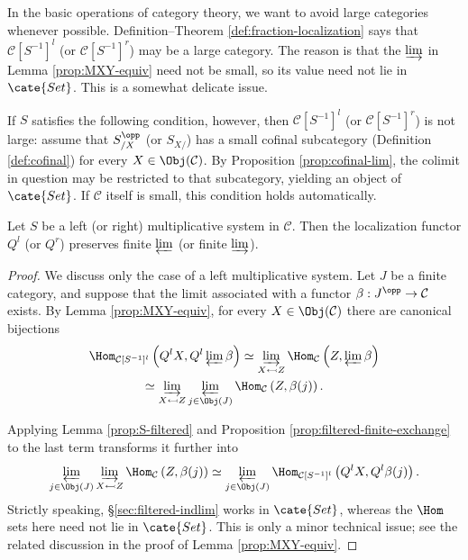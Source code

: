 \begin{remark}\label{rem:localization-size}
	In the basic operations of category theory, we want to avoid large
	categories whenever possible. Definition--Theorem
	\ref{def:fraction-localization} says that $\mathcal{C}[S^{-1}]^l$ (or
	$\mathcal{C}[S^{-1}]^r$) may be a large category. The reason is that the
	$\varinjlim$ in Lemma \ref{prop:MXY-equiv} need not be small, so its value
	need not lie in $\cate{Set}$. This is a somewhat delicate issue.

	If $S$ satisfies the following condition, however, then
	$\mathcal{C}[S^{-1}]^l$ (or $\mathcal{C}[S^{-1}]^r$) is not large: assume
	that $S_{/X}^{\opp}$ (or $S_{X/}$) has a small cofinal subcategory
	(Definition \ref{def:cofinal}) for every $X\in\Obj(\mathcal{C})$. By
	Proposition \ref{prop:cofinal-lim}, the colimit in question may be
	restricted to that subcategory, yielding an object of $\cate{Set}$. If
	$\mathcal{C}$ itself is small, this condition holds automatically.
\end{remark}

\begin{lemma}\label{prop:localization-prod}
	Let $S$ be a left (or right) multiplicative system in $\mathcal{C}$. Then
	the localization functor $Q^l$ (or $Q^r$) preserves finite $\varprojlim$
	(or finite $\varinjlim$).
\end{lemma}
\begin{proof}
	We discuss only the case of a left multiplicative system. Let $J$ be a
	finite category, and suppose that the limit associated with a functor
	$\beta:J^{\opp}\to\mathcal{C}$ exists. By Lemma \ref{prop:MXY-equiv}, for
	every $X\in\Obj(\mathcal{C})$ there are canonical bijections
	\begin{multline*}
		\Hom_{\mathcal{C}[S^{-1}]^l}\left(Q^lX,Q^l\varprojlim\beta\right)
		\simeq \varinjlim_{X\leftarrowtail Z}\Hom_{\mathcal{C}}\left(Z,\varprojlim\beta\right) \\
		\simeq \varinjlim_{X\leftarrowtail Z}\varprojlim_{j\in\Obj(J)}
		\Hom_{\mathcal{C}}\left(Z,\beta(j)\right).
	\end{multline*}

	Applying Lemma \ref{prop:S-filtered} and Proposition
	\ref{prop:filtered-finite-exchange} to the last term transforms it further
	into
	\[ \varprojlim_{j \in \Obj(J)} \varinjlim_{X \leftarrowtail Z} \Hom_{\mathcal{C}}\left( Z, \beta(j) \right) \simeq \varprojlim_{j \in \Obj(J)} \Hom_{\mathcal{C}[S^{-1}]^l} \left(Q^l X, Q^l \beta(j) \right). \]
	Strictly speaking, \S\ref{sec:filtered-indlim} works in $\cate{Set}$,
	whereas the $\Hom$ sets here need not lie in $\cate{Set}$. This is only a
	minor technical issue; see the related discussion in the proof of Lemma
	\ref{prop:MXY-equiv}.
\end{proof}

